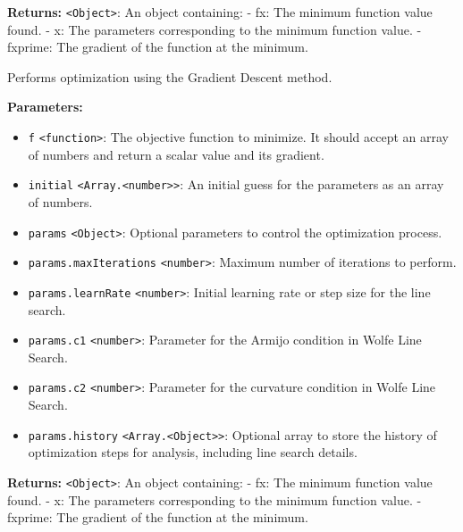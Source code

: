 \documentclass[12pt,a4paper]{article}
\begin{document}
\noindent \textbf{Returns:} \texttt{<Object>}: An object containing:
- \textasciigrave{}fx\textasciigrave{}: The minimum function value found.
- \textasciigrave{}x\textasciigrave{}: The parameters corresponding to the minimum function value.
- \textasciigrave{}fxprime\textasciigrave{}: The gradient of the function at the minimum.

\noindent Performs optimization using the Gradient Descent method.

\vspace{5mm}
\noindent {}


\noindent \textbf{Parameters:}
\begin{itemize}
  \item \texttt{f} \texttt{<function>}: The objective function to minimize. It should accept an array of numbers and return a scalar value and its gradient.
  \item \texttt{initial} \texttt{<Array.<number>>}: An initial guess for the parameters as an array of numbers.
  \item \texttt{params} \texttt{<Object>}: Optional parameters to control the optimization process.
  \item \texttt{params.maxIterations} \texttt{<number>}: Maximum number of iterations to perform.
  \item \texttt{params.learnRate} \texttt{<number>}: Initial learning rate or step size for the line search.
  \item \texttt{params.c1} \texttt{<number>}: Parameter for the Armijo condition in Wolfe Line Search.
  \item \texttt{params.c2} \texttt{<number>}: Parameter for the curvature condition in Wolfe Line Search.
  \item \texttt{params.history} \texttt{<Array.<Object>>}: Optional array to store the history of optimization steps for analysis, including line search details.
\end{itemize}

\noindent \textbf{Returns:} \texttt{<Object>}: An object containing:
- \textasciigrave{}fx\textasciigrave{}: The minimum function value found.
- \textasciigrave{}x\textasciigrave{}: The parameters corresponding to the minimum function value.
- \textasciigrave{}fxprime\textasciigrave{}: The gradient of the function at the minimum.
\end{document}
